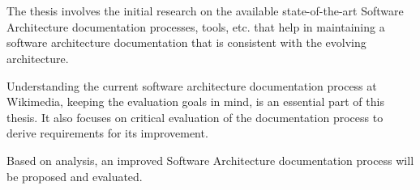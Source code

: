 \chapter{\abstractname}

The thesis involves the initial research on the available state-of-the-art Software Architecture documentation processes, tools, etc. that help in maintaining a software architecture documentation that is consistent with the evolving architecture.

Understanding the current software architecture documentation process at Wikimedia, keeping the evaluation goals in mind, is an essential part of this thesis. It also focuses on critical evaluation of the documentation process to derive requirements for its improvement.

Based on analysis, an improved Software Architecture documentation process will be proposed and evaluated.


